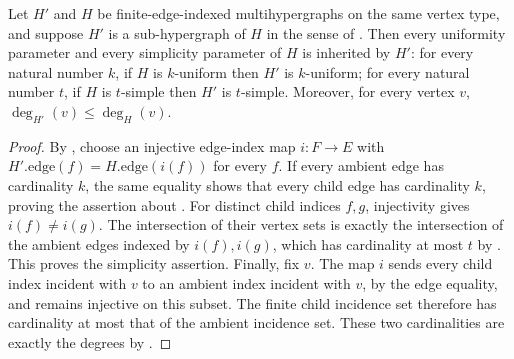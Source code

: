 \begin{lemma}
Let $H'$ and $H$ be finite-edge-indexed multihypergraphs on the same vertex
type, and suppose $H'$ is a sub-hypergraph of $H$ in the sense of
. Then every uniformity parameter and every
simplicity parameter of $H$ is inherited by $H'$:
for every natural number $k$, if $H$ is $k$-uniform then $H'$ is
$k$-uniform; for every natural number $t$, if $H$ is $t$-simple then $H'$
is $t$-simple. Moreover, for every vertex $v$,
$\deg_{H'}(v)\le\deg_H(v)$.
\end{lemma}
\begin{proof}
By , choose an injective edge-index map $i:F\to E$
with $H'.\mathrm{edge}(f)=H.\mathrm{edge}(i(f))$ for every $f$.
If every ambient edge has cardinality $k$, the same equality shows that
every child edge has cardinality $k$, proving the assertion about
.
For distinct child indices $f,g$, injectivity gives $i(f)\ne i(g)$.
The intersection of their vertex sets is exactly the intersection of the
ambient edges indexed by $i(f),i(g)$, which has cardinality at most $t$
by . This proves the simplicity assertion.
Finally, fix $v$. The map $i$ sends every child index incident with $v$
to an ambient index incident with $v$, by the edge equality, and remains
injective on this subset. The finite child incidence set therefore has
cardinality at most that of the ambient incidence set. These two
cardinalities are exactly the degrees by .
\end{proof}
